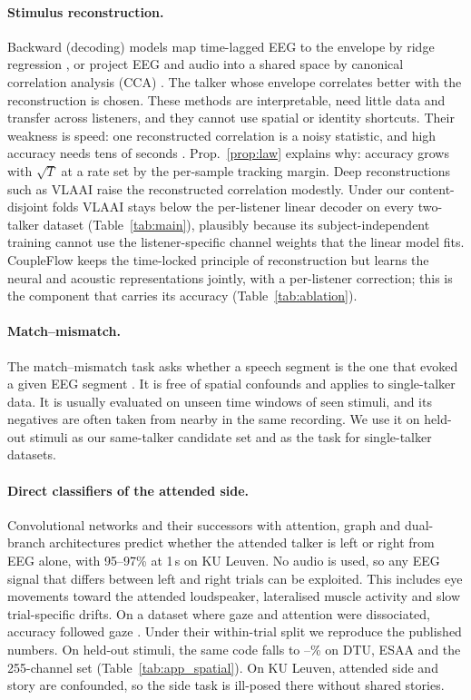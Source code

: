 \documentclass[twoside]{article}
\begin{document}
\paragraph{Stimulus reconstruction.} Backward (decoding) models map time-lagged EEG to the
envelope by ridge regression \citep{osullivan2015attentional,crosse2016mtrf}, or project
EEG and audio into a shared space by canonical correlation analysis (CCA)
\citep{decheveigne2018decoding}. The talker whose envelope correlates better with the
reconstruction is chosen. These methods are interpretable, need little data and transfer
across listeners, and they cannot use spatial or identity shortcuts. Their weakness is
speed: one reconstructed correlation is a noisy statistic, and high accuracy needs tens of
seconds \citep{geirnaert2021eeg}. Prop.~\ref{prop:law} explains why: accuracy grows with
$\sqrt T$ at a rate set by the per-sample tracking margin. Deep reconstructions such as
VLAAI \citep{accou2023vlaai} raise the reconstructed correlation modestly. Under our
content-disjoint folds VLAAI stays below the per-listener linear decoder on every
two-talker dataset (Table~\ref{tab:main}), plausibly because its subject-independent
training cannot use the listener-specific channel weights that the linear model fits.
CoupleFlow keeps the time-locked principle of reconstruction but learns the neural and
acoustic representations jointly, with a per-listener correction; this is the component
that carries its accuracy (Table~\ref{tab:ablation}).

\paragraph{Match--mismatch.} The match--mismatch task asks whether a speech segment is
the one that evoked a given EEG segment \citep{accou2021dilated,puffay2023relating}. It is
free of spatial confounds and applies to single-talker data. It is usually evaluated on
unseen time windows of seen stimuli, and its negatives are often taken from nearby in the
same recording. We use it on held-out stimuli as our same-talker candidate set and as the
task for single-talker datasets.

\paragraph{Direct classifiers of the attended side.} Convolutional networks
\citep{vandecappelle2021eeg} and their successors with attention, graph and dual-branch
architectures \citep{darnet2024,dbpnet2024,listennet2025} predict whether the attended
talker is left or right from EEG alone, with 95--97\% at 1\,s on KU Leuven. No audio is
used, so any EEG signal that differs between left and right trials can be exploited. This
includes eye movements toward the attended loudspeaker, lateralised muscle activity and
slow trial-specific drifts. On a dataset where gaze and attention were dissociated,
accuracy followed gaze \citep{rotaru2024what}. Under their within-trial split we reproduce
the published numbers. On held-out stimuli, the same code falls to \spAmin--\spAmax\% on
DTU, ESAA and the 255-channel set (Table~\ref{tab:app_spatial}). On KU Leuven, attended
side and story are confounded, so the side task is ill-posed there without shared
stories.
\end{document}
